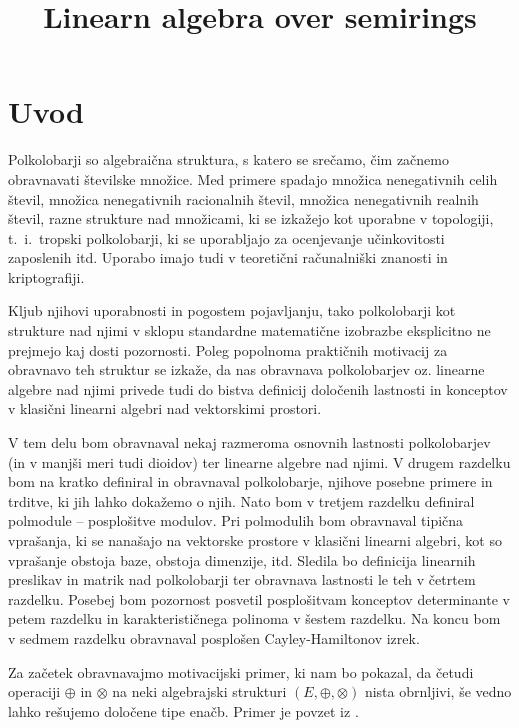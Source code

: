 \documentclass[mat1]{fmfdelo}
\title{Linearn algebra over semirings}
\begin{document}
\newpage
\tableofcontents
\newpage
\section{Uvod}
Polkolobarji so algebraična struktura, s katero se srečamo, čim začnemo obravnavati številske množice. Med primere spadajo množica nenegativnih celih števil, množica nenegativnih racionalnih števil, množica nenegativnih realnih števil, razne strukture nad množicami, ki se izkažejo kot uporabne v topologiji, t.~i.~tropski polkolobarji, ki se uporabljajo za ocenjevanje učinkovitosti zaposlenih itd. Uporabo imajo tudi v teoretični računalniški znanosti in kriptografiji. 

Kljub njihovi uporabnosti in pogostem pojavljanju, tako polkolobarji kot strukture nad njimi v sklopu standardne matematične izobrazbe eksplicitno ne prejmejo kaj dosti pozornosti. Poleg popolnoma praktičnih motivacij za obravnavo teh struktur se izkaže, da nas obravnava polkolobarjev oz. linearne algebre nad njimi privede tudi do bistva definicij določenih lastnosti in konceptov v klasični linearni algebri nad vektorskimi prostori. 

V tem delu bom obravnaval nekaj razmeroma osnovnih lastnosti polkolobarjev (in v manjši meri tudi dioidov) ter linearne algebre nad njimi. V drugem razdelku bom na kratko definiral in obravnaval polkolobarje, njihove posebne primere in trditve, ki jih lahko dokažemo o njih. Nato bom v tretjem razdelku definiral polmodule -- posplošitve modulov. Pri polmodulih bom obravnaval tipična vprašanja, ki se nanašajo na vektorske prostore v klasični linearni algebri, kot so vprašanje obstoja baze, obstoja dimenzije, itd. Sledila bo definicija linearnih preslikav in matrik nad polkolobarji ter obravnava lastnosti le teh v četrtem razdelku. Posebej bom pozornost posvetil posplošitvam konceptov determinante v petem razdelku in karakterističnega polinoma v šestem razdelku. Na koncu bom v sedmem razdelku obravnaval posplošen Cayley-Hamiltonov izrek.


Za začetek obravnavajmo motivacijski primer, ki nam bo pokazal, da četudi operaciji $\oplus$ in $\otimes$ na neki algebrajski strukturi $(E, \oplus, \otimes)$ nista obrnljivi, še vedno lahko rešujemo določene tipe enačb. Primer je povzet iz \cite{bib:Gondran}.
\end{document}
